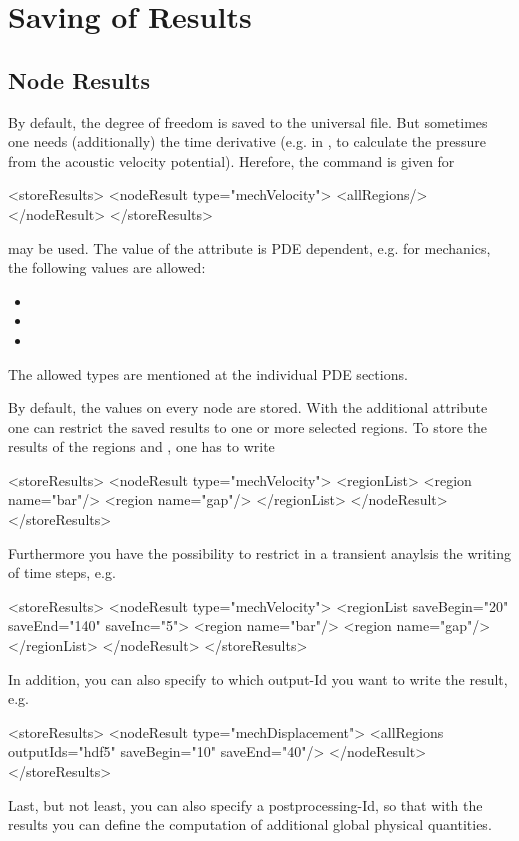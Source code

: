 \chapter{Saving of Results} 

\section{Node Results}
By default, the degree of freedom is saved to the universal file. But
sometimes one needs (additionally) the time derivative (e.g. in
, to calculate the pressure from the acoustic velocity
potential). Herefore, the command is given for 

\begin{xmllisting}
<storeResults>
   <nodeResult type="mechVelocity">
    <allRegions/>
   </nodeResult>
</storeResults>
\end{xmllisting}

may be used. The value of the attribute  is PDE dependent,
e.g. for mechanics, the following values are allowed:
\begin{itemize}
\item {}
\item {}
\item {}
\end{itemize}
The allowed types are mentioned at the individual PDE sections.

By default, the values on every node are stored. With the additional
attribute  one can restrict the saved results to one or
more selected regions.
To store the results of the regions  and , one
has to write
\begin{xmllisting}
<storeResults>
   <nodeResult type="mechVelocity">
    <regionList>
     <region name="bar"/>
     <region name="gap"/>
    </regionList>
   </nodeResult>
</storeResults>
\end{xmllisting}
Furthermore you have the possibility to restrict in a transient
anaylsis the writing of time steps, e.g.
\begin{xmllisting}
<storeResults>
   <nodeResult type="mechVelocity">
    <regionList saveBegin="20" saveEnd="140" saveInc="5">
     <region name="bar"/>
     <region name="gap"/>
    </regionList>
   </nodeResult>
</storeResults>
\end{xmllisting}
In addition, you can also specify to which output-Id you want to write
the result, e.g.
\begin{xmllisting}
<storeResults>
    <nodeResult type="mechDisplacement">
       <allRegions outputIds="hdf5" saveBegin="10" saveEnd="40"/>
    </nodeResult> 
</storeResults>
\end{xmllisting}
Last, but not least, you can also specify a postprocessing-Id, so that
with the results you can define the computation of additional global
physical quantities.
 

